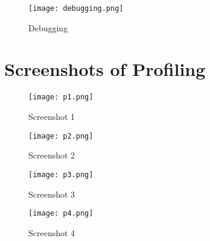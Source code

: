 \documentclass[16pt]{article}
\begin{document}
\begin{figure}[h]
  \centering
  \texttt{[image: debugging.png]}
  \caption{Debugging}
\end{figure}

\newpage

\section*{Screenshots of Profiling}

\begin{figure}[h]
  \centering
  \texttt{[image: p1.png]}
  \caption{Screenshot 1}
\end{figure}

\begin{figure}[h]
  \centering
  \texttt{[image: p2.png]}
  \caption{Screenshot 2}
\end{figure}

\begin{figure}[h]
  \centering
  \texttt{[image: p3.png]}
  \caption{Screenshot 3}
\end{figure}

\begin{figure}[h]
  \centering
  \texttt{[image: p4.png]}
  \caption{Screenshot 4}
\end{figure}
\end{document}
